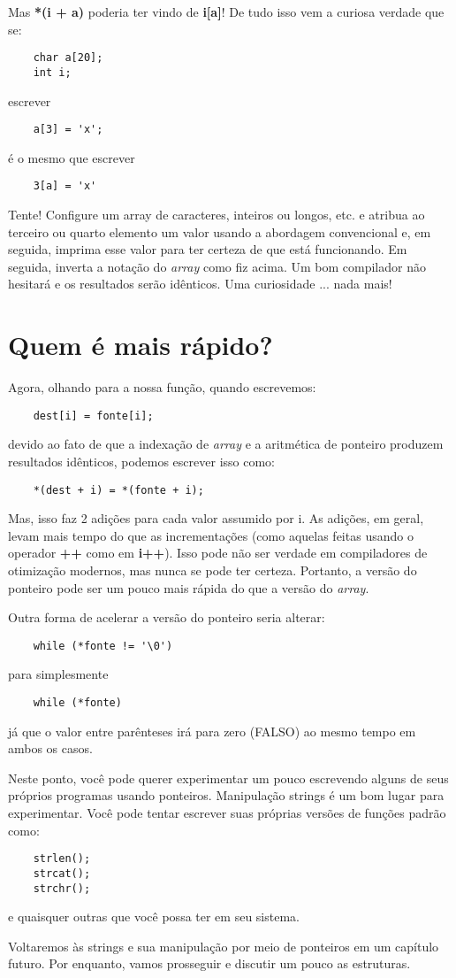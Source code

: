 Mas \textbf{*(i + a)} poderia ter vindo de \textbf{i[a]}! De tudo isso vem a curiosa verdade que se:
\begin{lstlisting}
	char a[20];
	int i;
\end{lstlisting}
escrever
\begin{lstlisting}
	a[3] = 'x';
\end{lstlisting}
é o mesmo que escrever
\begin{lstlisting}
	3[a] = 'x'
\end{lstlisting}

Tente! Configure um array de caracteres, inteiros ou longos, etc. e atribua ao terceiro ou quarto elemento um valor usando a abordagem convencional e, em seguida, imprima esse valor para ter certeza de que está funcionando. Em seguida, inverta a notação do \textit{array} como fiz acima. Um bom compilador não hesitará e os resultados serão idênticos. Uma curiosidade ... nada mais!

\section{Quem é mais rápido?}

Agora, olhando para a nossa função, quando escrevemos:
\begin{lstlisting}
	dest[i] = fonte[i];
\end{lstlisting}
devido ao fato de que a indexação de \textit{array} e a aritmética de ponteiro produzem resultados idênticos, podemos escrever isso como:
\begin{lstlisting}
	*(dest + i) = *(fonte + i);
\end{lstlisting}

Mas, isso faz 2 adições para cada valor assumido por i. As adições, em geral, levam mais tempo do que as incrementações (como aquelas feitas usando o operador \textbf{++} como em \textbf{i++}). Isso pode não ser verdade em compiladores de otimização modernos, mas nunca se pode ter certeza. Portanto, a versão do ponteiro pode ser um pouco mais rápida do que a versão do \textit{array}.

Outra forma de acelerar a versão do ponteiro seria alterar:
\begin{lstlisting}
	while (*fonte != '\0')
\end{lstlisting}
para simplesmente
\begin{lstlisting}
	while (*fonte)
\end{lstlisting}
já que o valor entre parênteses irá para zero (FALSO) ao mesmo tempo em ambos os casos.

Neste ponto, você pode querer experimentar um pouco escrevendo alguns de seus próprios programas usando ponteiros. Manipulação strings é um bom lugar para experimentar. Você pode tentar escrever suas próprias versões de funções padrão como:
\begin{lstlisting}
	strlen();
	strcat();
	strchr();
\end{lstlisting}
e quaisquer outras que você possa ter em seu sistema.

Voltaremos às strings e sua manipulação por meio de ponteiros em um capítulo futuro. Por enquanto, vamos prosseguir e discutir um pouco as estruturas.

